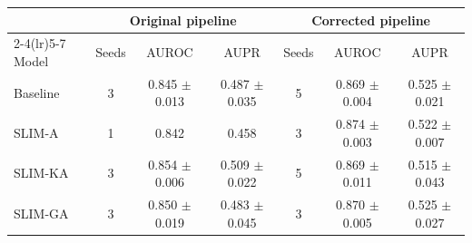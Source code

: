 \begin{tabular}{lcccccc}
\toprule
 & \multicolumn{3}{c}{Original pipeline} & \multicolumn{3}{c}{Corrected pipeline} \\
\cmidrule(lr){2-4}\cmidrule(lr){5-7}
Model & Seeds & AUROC & AUPR & Seeds & AUROC & AUPR \\
\midrule
Baseline & 3 & 0.845 $\pm$ 0.013 & 0.487 $\pm$ 0.035 & 5 & 0.869 $\pm$ 0.004 & 0.525 $\pm$ 0.021 \\
SLIM-A & 1 & 0.842 & 0.458 & 3 & 0.874 $\pm$ 0.003 & 0.522 $\pm$ 0.007 \\
SLIM-KA & 3 & 0.854 $\pm$ 0.006 & 0.509 $\pm$ 0.022 & 5 & 0.869 $\pm$ 0.011 & 0.515 $\pm$ 0.043 \\
SLIM-GA & 3 & 0.850 $\pm$ 0.019 & 0.483 $\pm$ 0.045 & 3 & 0.870 $\pm$ 0.005 & 0.525 $\pm$ 0.027 \\
\bottomrule
\end{tabular}
